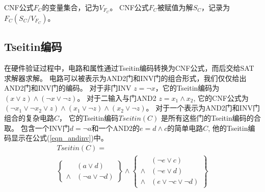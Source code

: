CNF公式$F_C$的变量集合，记为$V_{F_C}$。
CNF公式$F_C$被赋值为解$S_C$，记录为$F_C(S_C/V_{F_C})$。

\subsection{Tseitin编码}

在硬件验证过程中，电路和属性通过Tseitin编码\cite{Tseitin}转换为CNF公式，而后交给SAT求解器求解。
电路可以被表示为AND2门和INV门的组合形式，我们仅仅给出AND2门和INV门的编码。
对于非门INV $z=\neg x$，它的Tseitin编码为$(x\vee z)\wedge( \neg x\vee \neg z)$。
对于二输入与门AND2 $z=x_1\wedge x_2$,
它的CNF公式为$( \neg x_1\vee \neg x_2\vee z)\wedge(x_1\vee \neg z) \wedge(x_2\vee \neg z)$。
对于一个表示为AND2门和INV门组合的复杂电路$C$，
它的Tseitin编码$Tseitin(C)$ 是所有这些门的Tseitin编码的合取。
包含一个INV门$d=\neg a$和一个AND2的$e=d\wedge c$的简单电路$C$,
他的Tseitin编码显示在公式(\ref{eqn_andinv})中。
\begin{multline}\label{eqn_andinv}
Tseitin(C)=\\
\left\{
\begin{array}{cc}
& (a\vee d) \\
\wedge & (\neg a\vee \neg d)
\end{array}
\right\}\wedge\left\{
\begin{array}{cc}
& (\neg e\vee c) \\
\wedge & (\neg e\vee d) \\
\wedge & (e\vee \neg c\vee\neg d)
\end{array}
\right\}
\end{multline}

